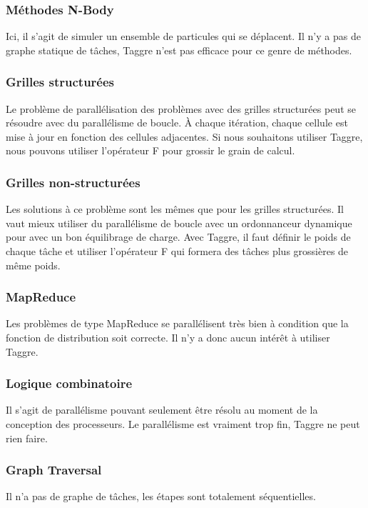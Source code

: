 \subsubsection{Méthodes N-Body}
Ici, il s'agit de simuler un ensemble de particules qui se déplacent.
%
Il n'y a pas de graphe statique de tâches, Taggre n'est pas efficace pour ce genre de méthodes.



\subsubsection{Grilles structurées}
Le problème de parallélisation des problèmes avec des grilles structurées peut se résoudre avec du parallélisme de boucle.
%
\`A chaque itération, chaque cellule est mise à jour en fonction des cellules adjacentes.
%
Si nous souhaitons utiliser Taggre, nous pouvons utiliser l'opérateur F pour grossir le grain de calcul.


\subsubsection{Grilles non-structurées}
Les solutions à ce problème sont les mêmes que pour les grilles structurées.
%
Il vaut mieux utiliser du parallélisme de boucle avec un ordonnanceur dynamique pour avec un bon équilibrage de charge.
%
Avec Taggre, il faut définir le poids de chaque tâche et utiliser l'opérateur F qui formera des tâches plus grossières de même poids.


\subsubsection{MapReduce}
Les problèmes de type MapReduce se parallélisent très bien à condition que la fonction de distribution soit correcte.
%
Il n'y a donc aucun intérêt à utiliser Taggre.



\subsubsection{Logique combinatoire}
Il s'agit de parallélisme pouvant seulement être résolu au moment de la conception des processeurs.
%
Le parallélisme est vraiment trop fin, Taggre ne peut rien faire.


\subsubsection{Graph Traversal}
Il n'a pas de graphe de tâches, les étapes sont totalement séquentielles.


